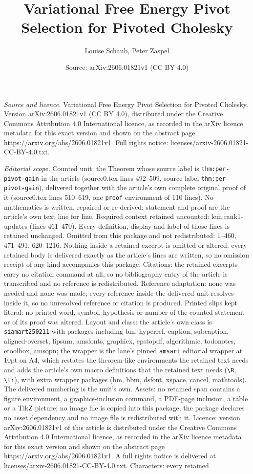 \documentclass[10pt,a4paper]{amsart}
\title[Variational Free Energy Pivot Selection for Pivoted Cholesky]{Variational Free Energy Pivot Selection for Pivoted Cholesky}
\author{Louise Schaub, Peter Zaspel}
\date{Source: arXiv:2606.01821v1 (CC BY 4.0)}
\begin{document}
\maketitle

\noindent\emph{Source and licence.} Variational Free Energy Pivot Selection for Pivoted Cholesky. Version arXiv:2606.01821v1 (CC BY 4.0), distributed under the Creative Commons Attribution 4.0 International licence, as recorded in the arXiv licence metadata for this exact version and shown on the abstract page https://arxiv.org/abs/2606.01821v1. Full rights notice: licenses/arxiv-2606.01821-CC-BY-4.0.txt.\par\smallskip

\noindent\textit{Editorial scope.} Counted unit: the Theorem whose source label is \texttt{thm:per-pivot-gain} in the article (source0.tex lines 492--509, source label \texttt{thm:per-pivot-gain}), delivered together with the article's own complete original proof of it (source0.tex lines 510--619, one \texttt{proof} environment of 110 lines). No mathematics is written, repaired or re-derived: statement and proof are the article's own text line for line. Required context retained uncounted: lem:rank1-updates (lines 461--470). Every definition, display and label of those lines is retained unchanged. Omitted from this package and not redistributed: 1--460, 471--491, 620--1216. Nothing inside a retained excerpt is omitted or altered: every retained body is delivered exactly as the article's lines are written, so no omission receipt of any kind accompanies this package. Citations: the retained excerpts carry no citation command at all, so no bibliography entry of the article is transcribed and no reference is redistributed. Reference adaptation: none was needed and none was made; every reference inside the delivered unit resolves inside it, so no unresolved reference or citation is produced. Printed slips kept literal: no printed word, symbol, hypothesis or number of the counted statement or of its proof was altered. Layout and class: the article's own class is \texttt{siamart250211} with packages including bm, hyperref, caption, subcaption, aligned-overset, lipsum, amsfonts, graphicx, epstopdf, algorithmic, todonotes, etoolbox, amsopn; the wrapper is the lane's pinned \texttt{amsart} editorial wrapper at 10pt on A4, which restates the theorem-like environments the retained text needs and adds the article's own macro definitions that the retained text needs (\texttt{\textbackslash R}, \texttt{\textbackslash tr}), with extra wrapper packages (bm, bbm, dsfont, xspace, cancel, mathtools). The delivered numbering is the unit's own. Assets: no retained span contains a figure environment, a graphics-inclusion command, a PDF-page inclusion, a table or a TikZ picture; no image file is copied into this package, the package declares no asset dependency and no image file is redistributed with it. Licence: version arXiv:2606.01821v1 of this article is distributed under the Creative Commons Attribution 4.0 International licence, as recorded in the arXiv licence metadata for this exact version and shown on the abstract page https://arxiv.org/abs/2606.01821v1. A full rights notice is delivered at licenses/arxiv-2606.01821-CC-BY-4.0.txt. Characters: every retained 
\end{document}
